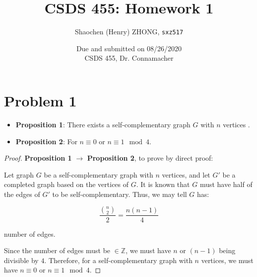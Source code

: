 \documentclass[12pt]{article}
\newcommand{\ilc}{\texttt}
\begin{document}
\title{\textbf{CSDS 455: Homework 1}}

\author{Shaochen (Henry) ZHONG, \ilc{sxz517}}
\date{Due and submitted on 08/26/2020 \\ CSDS 455, Dr. Connamacher}
\maketitle

\section{Problem 1}

\begin{itemize}
    \item \textbf{Proposition 1}: There exists a self-complementary graph $G$ with $n$ vertices .
    \item \textbf{Proposition 2}: For $n \equiv 0$ or $n \equiv 1 \mod 4$.
\end{itemize}

\begin{proof}
\textbf{Proposition 1} $\longrightarrow$ \textbf{Proposition 2}, to prove by direct proof:\newline

Let graph $G$ be a self-complementary graph with $n$ vertices, and let $G'$ be a completed graph based on the vertices of $G$. It is known that $G$ must have half of the edges of $G'$ to be self-complementary. Thus, we may tell $G$ has:

\begin{equation}
    \frac{{n \choose 2}}{2} = \frac{n(n-1)}{4} \nonumber
\end{equation}

number of edges.

Since the number of edges must be $\in \mathbb{Z}$, we must have $n$ or $(n-1)$ being divisible by $4$. Therefore, for a self-complementary graph with $n$ vertices, we must have $n \equiv 0$ or $n \equiv 1 \mod 4$.
\end{proof}
\end{document}
